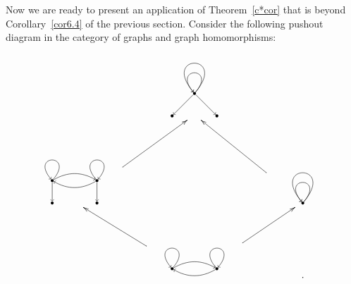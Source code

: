 \documentclass[12pt,times,a4paper]{amsart}
\numberwithin{equation}{section}
\numberwithin{equation}{section}
\begin{document}
Now we are ready to present an application of Theorem~\ref{c*cor} that is beyond Corollary~\ref{cor6.4} of the previous section. Consider the following pushout diagram in the category of graphs and graph homomorphisms: 
\begin{equation}
\begin{gathered}
\xymatrix{
&
\begin{tikzpicture}[scale=0.4,auto,swap]
\centering
\tikzstyle{vertex}=[circle,fill=black,minimum size=3pt,inner sep=0pt]
\tikzstyle{edge}=[draw,->]
    \node[vertex] (2) at (0,0) {};
    \node[vertex] (4) at (-2,-2) {};
    \node[vertex] (5) at (2,-2) {};
    \path (2) edge [edge, anchor=center, loop above,min distance=20mm,in=130,out=50,looseness=40] node {} (2);
    \path (2) edge [edge, anchor=center, loop above,min distance=20mm,in=130,out=50,looseness=60] node {} (2);
    \path (2) edge [edge] node {} (4);
    \path (2) edge [edge] node {} (5);
\end{tikzpicture}
&\\
\begin{tikzpicture}[scale=0.4,auto,swap]
\centering
\tikzstyle{vertex}=[circle,fill=black,minimum size=3pt,inner sep=0pt]
\tikzstyle{edge}=[draw,->]
\tikzset{every loop/.style={min distance=20mm,in=130,out=50,looseness=40}}
    \node[vertex] (1) at (-2,0) {};
    \node[vertex] (3) at (2,0) {};
    \node[vertex] (4) at (-2,-2) {};
     \node[vertex] (5) at (2,-2) {};
    \path (1) edge [edge, anchor=center, loop above] node {} (1);
    \path (3) edge [draw, <-, anchor=center, loop above] node {} (3);
    \path (1) edge [edge, bend left] node {} (3);
    \path (3) edge [edge, bend left] node {} (1);
    \path (1) edge [edge] node {} (4);
    \path (3) edge [edge] node {} (5);
\end{tikzpicture}
\ar[ur]& & 
\begin{tikzpicture}[scale=0.4,auto,swap]
\centering
\tikzstyle{vertex}=[circle,fill=black,minimum size=3pt,inner sep=0pt]
\tikzstyle{edge}=[draw,->]
    \node[vertex] (1) at (0,0) {};
    \path (1) edge [edge, anchor=center, loop above, min distance=20mm, in=130, out=50, looseness=40] node {} (1);
    \path (1) edge [edge, anchor=center, loop below, in=130, out=50, looseness=60] node {} (1);
\end{tikzpicture}
\ar[ul]\\
&
\begin{tikzpicture}[scale=0.4,auto,swap]
\centering
\tikzstyle{vertex}=[circle,fill=black,minimum size=3pt,inner sep=0pt]
\tikzstyle{edge}=[draw,->]
\tikzset{every loop/.style={min distance=20mm,in=130,out=50,looseness=40}}
    \node[vertex] (1) at (-2,0) {};
    \node[vertex] (2) at (2,0) {};
    \path (1) edge [edge, anchor=center, loop above] node {} (1);
    \path (2) edge [draw,<-, anchor=center, loop above] node {} (2);
    \path (1) edge [edge, bend left] node {} (2);
    \path (2) edge [edge, bend left] node {} (1);
\end{tikzpicture}
\ar[ur]\ar[ul]&
.}
\end{gathered}
\end{equation}
\end{document}
